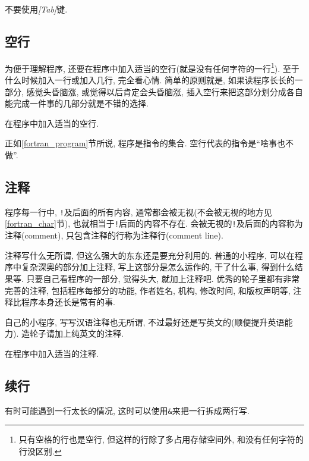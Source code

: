 \begin{convention}
    不要使用\emph{[Tab]}键.
\end{convention}

\subsection{空行}

为便于理解程序, 还要在程序中加入适当的空行(就是没有任何字符的一行\footnote{
    只有空格的行也是空行, 但这样的行除了多占用存储空间外, 和没有任何字符的行没区别.
}). 至于什么时候加入一行或加入几行, 完全看心情. 简单的原则就是, 如果读程序长长的一部分, 感觉头昏脑涨, 或觉得以后肯定会头昏脑涨, 插入空行来把这部分划分成各自能完成一件事的几部分就是不错的选择.

\begin{convention}
    在程序中加入适当的空行.
\end{convention}

正如\ref{fortran_program}节所说, 程序是指令的集合. 空行代表的指令是``啥事也不做''.

\subsection{注释}

程序每一行中, \texttt{!}及后面的所有内容, 通常都会被无视(不会被无视的地方见\ref{fortran_char}节), 也就相当于\texttt{!}后面的内容不存在. 会被无视的\texttt{!}及后面的内容称为注释(comment), 只包含注释的行称为注释行(comment line).

注释写什么无所谓, 但这么强大的东东还是要充分利用的. 普通的小程序, 可以在程序中复杂深奥的部分加上注释, 写上这部分是怎么运作的, 干了什么事, 得到什么结果等. 只要自己看程序的一部分, 觉得头大, 就加上注释吧. 优秀的轮子里都有非常完善的注释, 包括程序每部分的功能, 作者姓名, 机构, 修改时间, 和版权声明等, 注释比程序本身还长是常有的事.

自己的小程序, 写写汉语注释也无所谓, 不过最好还是写英文的(顺便提升英语能力). 造轮子请加上纯英文的注释.

\begin{convention}
    在程序中加入适当的注释.
\end{convention}

\subsection{续行}

有时可能遇到一行太长的情况, 这时可以使用\texttt{\&{}}来把一行拆成两行写.

